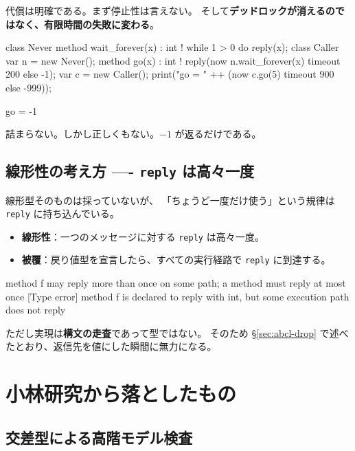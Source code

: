 \documentclass[11pt,a4paper]{ltjsarticle}
\theoremstyle{definition}
\theoremstyle{remark}
\begin{document}
代償は明確である。まず停止性は言えない。
そして\textbf{デッドロックが消えるのではなく、有限時間の失敗に変わる}。

\begin{aipl}
class Never  { method wait_forever(x) : int !{} { while 1 > 0 do { } reply(x); } }
class Caller {
  var n = new Never();
  method go(x) : int !{} { reply(now n.wait_forever(x) timeout 200 else -1); }
}
var c = new Caller();
print("go = " ++ (now c.go(5) timeout 900 else -999));
\end{aipl}
\begin{term}
go = -1
\end{term}

詰まらない。しかし正しくもない。$-1$ が返るだけである。

\subsection{線形性の考え方 ---- \texttt{reply} は高々一度}

線形型そのものは採っていないが、
「ちょうど一度だけ使う」という規律は \texttt{reply} に持ち込んでいる。

\begin{itemize}
\item \textbf{線形性}：一つのメッセージに対する \texttt{reply} は高々一度。
\item \textbf{被覆}：戻り値型を宣言したら、すべての実行経路で \texttt{reply} に到達する。
\end{itemize}

\begin{term}
 method f may reply more than once on some path;
             a method must reply at most once
[Type error] method f is declared to reply with int,
             but some execution path does not reply
\end{term}

ただし実現は\textbf{構文の走査}であって型ではない。
そのため \S\ref{sec:abcl-drop} で述べたとおり、返信先を値にした瞬間に無力になる。

\section{小林研究から落としたもの}
\label{sec:koba-drop}

\subsection{交差型による高階モデル検査}
\end{document}
